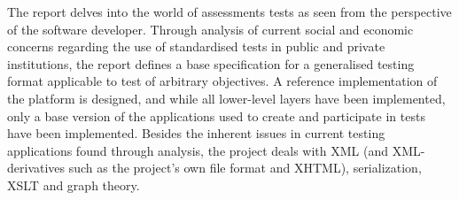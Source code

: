 The report delves into the world of assessments tests as seen from the perspective of the software developer. Through analysis of current social and economic concerns regarding the use of standardised tests in public and private institutions, the report defines a base specification for a generalised testing format applicable to test of arbitrary objectives. A reference implementation of the platform is designed, and while all lower-level layers have been implemented, only a base version of the applications used to create and participate in tests have been implemented. Besides the inherent issues in current testing applications found through analysis, the project deals with XML (and XML-derivatives such as the project's own file format and XHTML), serialization, XSLT and graph theory.